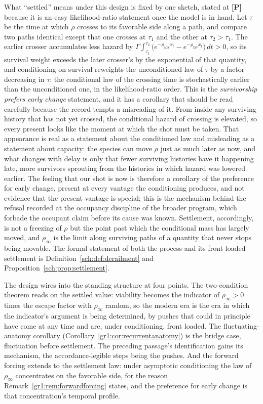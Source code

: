 \documentclass[11pt]{article}
\theoremstyle{plain}
\theoremstyle{definition}
\theoremstyle{remark}
\begin{document}
What ``settled'' means under this design is fixed by one sketch,
stated at \textbf{[P]} because it is an easy likelihood-ratio
statement once the model is in hand. Let $\tau$ be the time at which
$\rho$ crosses to its favorable side along a path, and compare two
paths identical except that one crosses at $\tau_1$ and the other at
$\tau_2>\tau_1$. The earlier crosser accumulates less hazard by
$\Gamma\!\int_{\tau_1}^{\tau_2}\bigl(e^{-\rho_{\mathrm{adv}}x_t}
-e^{-\rho_{\mathrm{fav}}x_t}\bigr)\,dt>0$, so its survival weight
exceeds the later crosser's by the exponential of that quantity, and
conditioning on survival reweights the unconditioned law of $\tau$
by a factor decreasing in $\tau$: the conditional law of the
crossing time is stochastically earlier than the unconditioned one,
in the likelihood-ratio order. This is the \emph{survivorship prefers
early change} statement, and it has a corollary that should be read
carefully because the record tempts a misreading of it. From inside
any surviving history that has not yet crossed, the conditional
hazard of crossing is elevated, so every present looks like the
moment at which the shot must be taken. That appearance is real as a
statement about the conditioned law and misleading as a statement
about capacity: the species can move $\rho$ just as much later as
now, and what changes with delay is only that fewer surviving
histories have it happening late, more survivors sprouting from the
histories in which hazard was lowered earlier. The feeling that our
shot is now is therefore a corollary of the preference for early
change, present at every vantage the conditioning produces, and not
evidence that the present vantage is special; this is the mechanism
behind the refusal recorded at the occupancy discipline of the broader program,
which forbade the occupant claim before its cause was known.
Settlement, accordingly, is not a freezing of $\rho$ but the point
past which the conditional mass has largely moved, and $\rho_\infty$
is the limit along surviving paths of a quantity that never stops
being movable. The formal statement of both the process and its
front-loaded settlement is Definition~\ref{sch:def:derailment} and
Proposition~\ref{sch:prop:settlement}.

The design wires into the standing structure at four points. The
two-condition theorem reads on the settled value: viability becomes
the indicator of $\rho_\infty>0$ times the escape factor with
$\rho_\infty$ random, so the modern era is the era in which the
indicator's argument is being determined, by pushes that could in
principle have come at any time and are, under conditioning, front
loaded. The fluctuating-anatomy corollary
(Corollary~\ref{gr1:cor:recurrentanatomy}) is the bridge case,
fluctuation before settlement. The preceding passage's
identification gains its mechanism, the accordance-legible steps
being the pushes. And the forward forcing extends to the settlement
law: under asymptotic conditioning the law of $\rho_\infty$
concentrates on the favorable side, for the reason
Remark~\ref{gr1:rem:forwardforcing} states, and the preference for
early change is that concentration's temporal profile.
\end{document}

